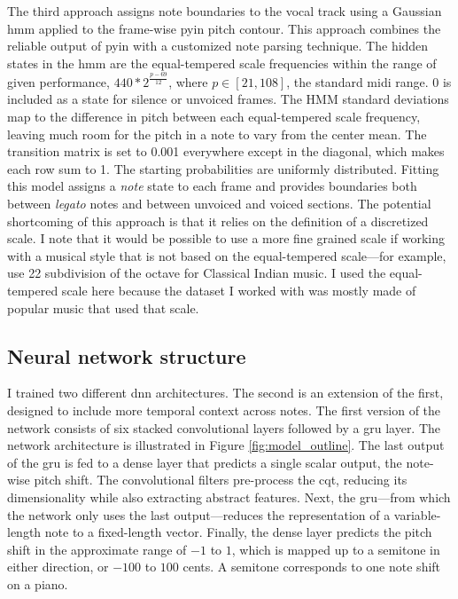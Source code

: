 The third approach assigns note boundaries to the vocal track using a Gaussian \gls{hmm} applied to the frame-wise \gls{pyin} pitch contour. This approach combines the reliable output of \gls{pyin} with a customized note parsing technique. The hidden states in the \gls{hmm} are the equal-tempered scale frequencies within the range of given performance, $440 * 2^{\frac{p - 69}{12}}$, where $p \in [21, 108]$, the standard \gls{midi} range. 0 is included as a state for silence or unvoiced frames. The HMM standard deviations map to the difference in pitch between each equal-tempered scale frequency, leaving much room for the pitch in a note to vary from the center mean. The transition matrix is set to 0.001 everywhere except in the diagonal, which makes each row sum to 1. The starting probabilities are uniformly distributed. Fitting this model assigns a \textit{note} state to each frame and provides boundaries both between \textit{legato} notes and between unvoiced and voiced sections. The potential shortcoming of this approach is that it relies on the definition of a discretized scale. I note that it would be possible to use a more fine grained scale if working with a musical style that is not based on the equal-tempered scale---for example, use 22 subdivision of the octave for Classical Indian music. I used the equal-tempered scale here because the dataset I worked with was mostly made of popular music that used that scale.  

\subsection{Neural network structure}
I trained two different \gls{dnn} architectures. The second is an extension of the first, designed to include more temporal context across notes. The first version of the network consists of six stacked convolutional layers followed by a \gls{gru} layer. The network architecture is illustrated in Figure \ref{fig:model_outline}. The last output of the \gls{gru} is fed to a dense layer that predicts a single scalar output, the note-wise pitch shift. The convolutional filters pre-process the \gls{cqt}, reducing its dimensionality while also extracting abstract features. Next, the \gls{gru}---from which the network only uses the last output---reduces the representation of a variable-length note to a fixed-length vector. Finally, the dense layer predicts the pitch shift in the approximate range of $-1$ to $1$, which is mapped up to a semitone in either direction, or $-100$ to $100$ cents. A semitone corresponds to one note shift on a piano. 

